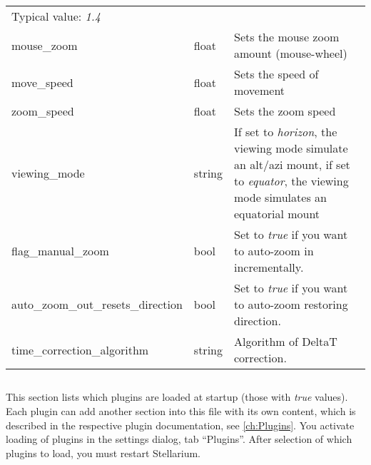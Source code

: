 \begin{longtable}{l|l|p{77mm}}
                                           Typical value: \emph{1.4}\\%
mouse\_zoom                     & float  & Sets the mouse zoom amount (mouse-wheel)\\%
move\_speed                     & float  & Sets the speed of movement\\%
zoom\_speed                     & float  & Sets the zoom speed\\%
viewing\_mode                   & string & If set to \emph{horizon}, the viewing mode simulate an alt/azi mount, 
                                           if set to \emph{equator}, the viewing mode simulates an equatorial mount\\%
flag\_manual\_zoom              & bool   & Set to \emph{true} if you want to auto-zoom in incrementally.\\%
auto\_zoom\_out\_resets\_direction & bool & Set to \emph{true} if you want to auto-zoom restoring direction.\\%
time\_correction\_algorithm     & string & Algorithm of DeltaT correction.\\\bottomrule %
\end{longtable}

\subsection{}

This section lists which plugins are loaded at startup (those with
\emph{true} values). Each plugin can add another section into this
file with its own content, which is described in the respective plugin
documentation, see \ref{ch:Plugins}. You activate loading of plugins
in the  settings dialog, tab ``Plugins''. After selection of
which plugins to load, you must restart Stellarium.

